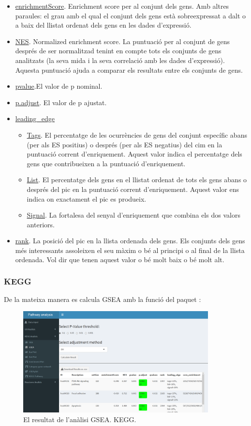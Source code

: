 \documentclass[]{article}
\begin{document}
\begin{itemize}
\item \underline{enrichmentScore}. Enrichment score per al conjunt dels gens. Amb altres paraules: el grau amb el qual el conjunt dels gens està sobreexpressat a dalt o a baix del llistat ordenat dels gens en les dades d'expressió.
\item \underline{NES}. Normalized enrichment score. La puntuació per al conjunt de gens després de ser normalitzad tenint en compte tots els conjunts de gens analitzats (la seva mida i la seva correlació amb les dades d'expressió). Aquesta puntuació ajuda a comparar els resultats entre els conjunts de gens.
\item \underline{pvalue}.El valor de p nominal.
\item \underline{p.adjust}. El valor de p ajustat.
\item \underline{leading\_edge}
\begin{itemize}
\item \underline{Tags}. El percentatge de les ocurrències de gens del conjunt específic abans (per als ES positius) o després (per als ES negatius) del cim en la puntuació corrent d'enriquement. Aquest valor indica el percentatge dels gens que contribueixen a la puntuació d'enriquement. 
\item \underline{List}. El percentatge dels gens en el llistat ordenat de tots els gens abans o després del pic en la puntuació corrent d'enriquement. Aquest valor ens indica on exactament el pic es produeix. 
\item \underline{Signal}. La fortalesa del senyal d'enriquement que combina els dos valors anteriors.
\end{itemize}
\item \underline{rank}. La posició del pic en la llista ordenada dels gens. Els conjunts dels gens més interessants assoleixen el seu màxim o bé al principi o al final de la llista ordenada. Vol dir que tenen aquest valor o bé molt baix o bé molt alt.
\end{itemize}

\subsubsection{KEGG}
De la mateixa manera es calcula GSEA amb la funció  del paquet :

\begin{figure}[H]
\centering
\includegraphics[width=0.9\textwidth]{App_F12_Items_KEGG_GSEA.png} 
\caption{El resultat de l'anàlisi GSEA. KEGG.}
\end{figure}
\end{document}

